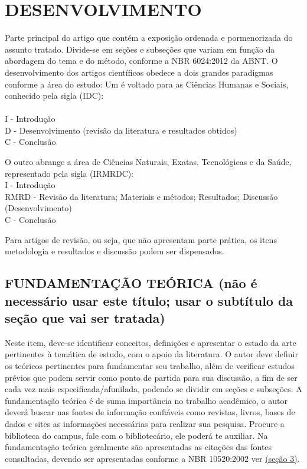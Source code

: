 \documentclass[12pt]{article}
\begin{document}
\section{DESENVOLVIMENTO} %

Parte principal do artigo que contém a exposição ordenada e pormenorizada do assunto tratado. Divide-se em seções e subseções que variam em função da abordagem do tema e do método, conforme a NBR 6024:2012 da ABNT. O desenvolvimento dos artigos científicos obedece a dois grandes paradigmas conforme a área do estudo:
Um é voltado para as Ciências Humanas e Sociais, conhecido pela sigla (IDC): \\
\\I
- Introdução
\\D
- Desenvolvimento (revisão da literatura e resultados obtidos)
\\C
- Conclusão


O outro abrange a área de Ciências Naturais, Exatas, Tecnológicas e da Saúde, representado pela sigla (IRMRDC): 
\\I
- Introdução
\\RMRD
- Revisão da literatura; Materiais e métodos; Resultados; Discussão (Desenvolvimento)
\\C
- Conclusão

Para artigos de revisão, ou seja, que não apresentam parte prática, os itens metodologia e resultados e discussão podem ser dispensados.


\subsection{FUNDAMENTAÇÃO TEÓRICA (não é necessário usar este título; usar o subtítulo da seção que vai ser tratada)}

Neste item, deve-se identificar conceitos, definições e apresentar o estado da arte pertinentes à temática de estudo, com o apoio da literatura. O autor deve definir os teóricos pertinentes para fundamentar seu trabalho, além de verificar estudos prévios que podem servir como ponto de partida para sua discussão, a fim de ser cada vez mais especificada/afunilada, podendo se dividir em seções e subseções.
A fundamentação teórica é de suma importância no trabalho acadêmico, o autor deverá buscar nas fontes de informação confiáveis como revistas, livros, bases de dados e sites as informações necessárias para realizar sua pesquisa. Procure a biblioteca do campus, fale com o bibliotecário, ele poderá te auxiliar.
Na fundamentação teórica geralmente são apresentadas as citações das fontes consultadas, devendo ser apresentadas conforme a NBR 10520:2002 ver \underline{(seção 3)}. 
\end{document}
